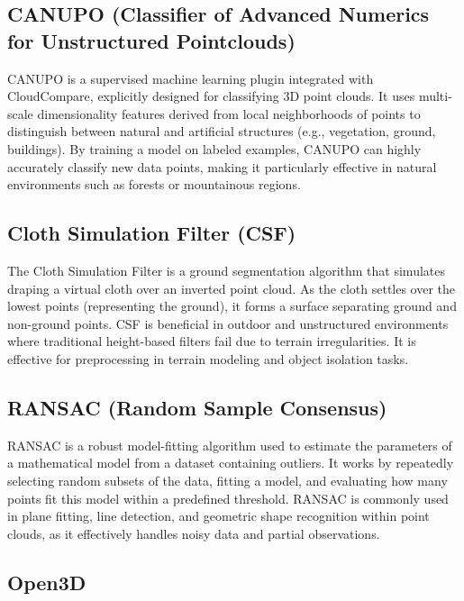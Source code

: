 \documentclass[../report.tex]{subfiles}
\begin{document}
    \subsection{CANUPO (Classifier of Advanced Numerics for Unstructured Pointclouds)}
    
    CANUPO is a supervised machine learning plugin integrated with CloudCompare, explicitly designed for classifying 3D point clouds. It uses multi-scale dimensionality features derived from local neighborhoods of points to distinguish between natural and artificial structures (e.g., vegetation, ground, buildings). By training a model on labeled examples, CANUPO can highly accurately classify new data points, making it particularly effective in natural environments such as forests or mountainous regions.\cite{canupo} \cite{canupo2}
    
    \subsection{Cloth Simulation Filter (CSF)}
    
    The Cloth Simulation Filter\cite{ClothSF} is a ground segmentation algorithm that simulates draping a virtual cloth over an inverted point cloud. As the cloth settles over the lowest points (representing the ground), it forms a surface separating ground and non-ground points. CSF is beneficial in outdoor and unstructured environments where traditional height-based filters fail due to terrain irregularities. It is effective for preprocessing in terrain modeling and object isolation tasks.
    
    \subsection{RANSAC (Random Sample Consensus)}
    
    RANSAC is a robust model-fitting algorithm used to estimate the parameters of a mathematical model from a dataset containing outliers\cite{RANSAC}. It works by repeatedly selecting random subsets of the data, fitting a model, and evaluating how many points fit this model within a predefined threshold. RANSAC is commonly used in plane fitting, line detection, and geometric shape recognition within point clouds, as it effectively handles noisy data and partial observations.
    
    \subsection{Open3D}
    
\end{document}
